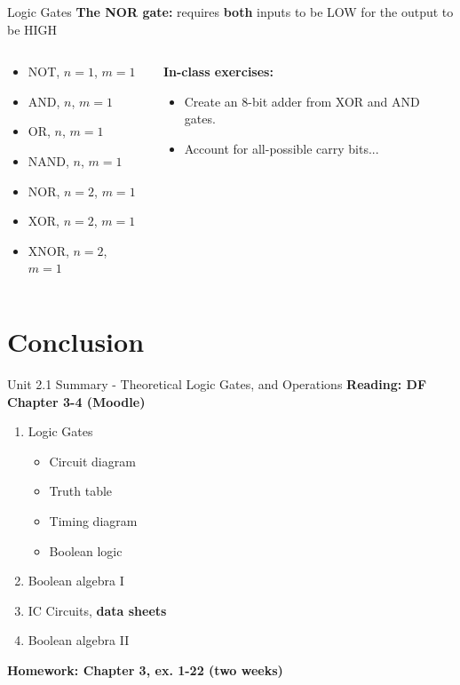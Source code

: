 \documentclass{beamer}
\begin{document}
\begin{frame}{Logic Gates}
\textbf{The NOR gate:} requires \textbf{both} inputs to be LOW for the output to be HIGH \\ \vspace{0.5cm}
\begin{columns}[T]
\begin{column}{0.5\textwidth}
\begin{itemize}
\item \alert{NOT, $n=1$, $m=1$}
\item \alert{AND, $n$, $m=1$}
\item \alert{OR, $n$, $m=1$}
\item \alert{NAND, $n$, $m=1$}
\item \alert{NOR, $n=2$, $m=1$}
\item \alert{XOR, $n=2$, $m=1$}
\item \alert{XNOR, $n=2$, $m=1$}
\end{itemize}
\end{column}
\begin{column}{0.5\textwidth}
\tiny
\textbf{In-class exercises:}
\begin{itemize}
\item Create an 8-bit adder from XOR and AND gates.
\item Account for all-possible carry bits...
\end{itemize}
\end{column}
\end{columns}
\end{frame}

\section{Conclusion}

\begin{frame}{Unit 2.1 Summary - Theoretical Logic Gates, and Operations}
\textbf{Reading: DF Chapter 3-4 (Moodle)}
\begin{enumerate}
\item Logic Gates
\begin{itemize}
\item Circuit diagram
\item Truth table
\item Timing diagram
\item Boolean logic
\end{itemize}
\item \alert{Boolean algebra I}
\item IC Circuits, \textbf{data sheets}
\item \alert{Boolean algebra II}
\end{enumerate}
\textbf{Homework: Chapter 3, ex. 1-22 (two weeks)}
\end{frame}
\end{document}
